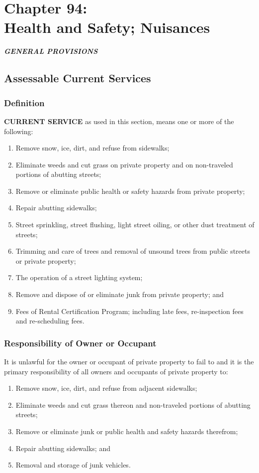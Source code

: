 \chapter*{Chapter 94: \\
	Health and Safety; Nuisances}
    \minitoc
    \pagebreak

\begin{center}
\emph{\textbf{\LARGE{GENERAL PROVISIONS}}}
\end{center}
\section{Assessable Current Services}
\subsection{Definition}
\textbf{CURRENT SERVICE} as used in this section, means one or more of the following: 
\begin{enumerate}[{\indent}1)]
    \item Remove snow, ice, dirt, and refuse from sidewalks; 
    \item Eliminate weeds and cut grass on private property and on non-traveled portions of abutting streets; 
    \item Remove or eliminate public health or safety hazards from private property; 
    \item Repair abutting sidewalks; 
    \item Street sprinkling, street flushing, light street oiling, or other dust treatment of streets; 
    \item Trimming and care of trees and removal of unsound trees from public streets or private property; 
    \item The operation of a street lighting system; 
    \item Remove and dispose of or eliminate junk from private property; and
    \item Fees of Rental Certification Program; including late fees, re-inspection fees and re-scheduling fees.
\end{enumerate}
\subsection{Responsibility of Owner or Occupant}
It is unlawful for the owner or occupant of private property to fail to and it is the primary responsibility of all owners and occupants of private property to: 
\begin{enumerate}[{\indent}1)]
    \item Remove snow, ice, dirt, and refuse from adjacent sidewalks; 
    \item Eliminate weeds and cut grass thereon and non-traveled portions of abutting streets; 
    \item Remove or eliminate junk or public health and safety hazards therefrom; 
    \item Repair abutting sidewalks; and
    \item Removal and storage of junk vehicles.
\end{enumerate}
